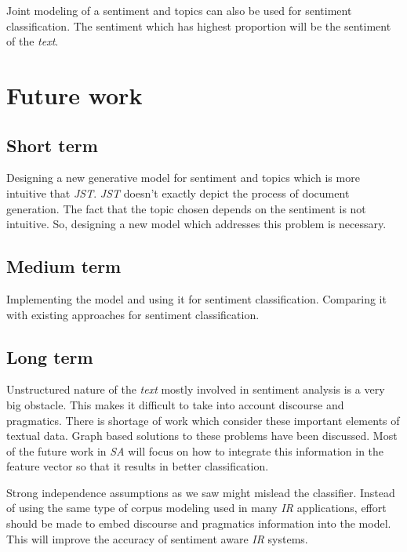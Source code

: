 Joint modeling of a sentiment and topics can also be used for sentiment classification. The sentiment which has highest proportion will be
the sentiment of the \textit{text}.

\section{Future work}

\subsection{Short term}
Designing a new generative model for sentiment and topics which is more intuitive that \textit{JST}. \textit{JST} doesn't exactly depict
the process of document generation. The fact that the topic chosen depends on the sentiment is not intuitive. So, designing a new model 
which addresses this problem is necessary.

\subsection{Medium term}
Implementing the model and using it for sentiment classification. Comparing it with existing approaches for sentiment classification.

\subsection{Long term}

Unstructured nature of the \textit{text} mostly involved in sentiment analysis is a very big obstacle. This makes it difficult
to take into account discourse and pragmatics. There is shortage of work which consider these important elements of textual data.
Graph based solutions to these problems have been discussed. Most of the future work in \textit{SA} will focus on how to integrate this
information in the feature vector so that it results in better classification.

Strong independence assumptions as we saw might mislead the classifier. Instead of using the same type of corpus modeling used 
in many \textit{IR} applications, effort should be made to embed discourse and pragmatics information into the model. This will improve
the accuracy of sentiment aware \textit{IR} systems. 
